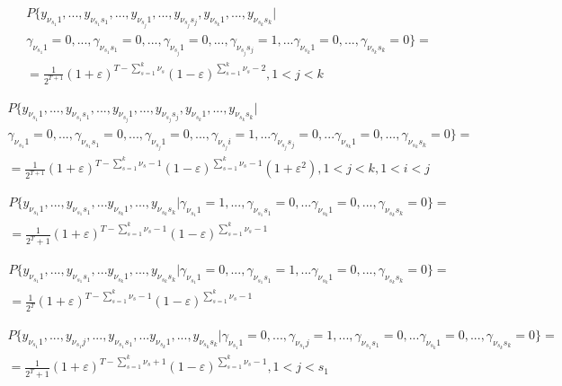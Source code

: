 \documentclass[a4paper,12pt]{article}
\theoremstyle{plain}
\begin{document}
    \begin{gather*}
    P\{y_{\nu_{s_1}1},..., y_{\nu_{s_1}s_1}, ...,y_{\nu_{s_j}1},...,y_{\nu_{s_j}s_j}, y_{\nu_{s_k}1},...,y_{\nu_{s_k}s_k}|\\ \gamma_{\nu_{s_1}1}=0, ..., \gamma_{\nu_{s_1}s_1}=0,...,\gamma_{\nu_{s_j}1}=0,...,\gamma_{\nu_{s_j}s_j}=1,  ...\gamma_{\nu_{s_k}1}=0,...,\gamma_{\nu_{s_k}s_k}=0\} =\\  =\frac{1}{2^{T+1}}(1+\varepsilon)^{T-\sum\limits_{s=1}^{k}\nu_s} (1-\varepsilon)^{\sum\limits_{s=1}^{k}\nu_s-2}, 1<j<k
    \end{gather*} 
    
 
    
    \begin{gather*}
    P\{y_{\nu_{s_1}1},..., y_{\nu_{s_1}s_1}, ...,y_{\nu_{s_j}1},...,y_{\nu_{s_j}s_j}, y_{\nu_{s_k}1},...,y_{\nu_{s_k}s_k}|\\ \gamma_{\nu_{s_1}1}=0, ..., \gamma_{\nu_{s_1}s_1}=0,...,\gamma_{\nu_{s_j}1}=0,...,\gamma_{\nu_{s_j}i}=1,...\gamma_{\nu_{s_j}s_j}=0,  ...\gamma_{\nu_{s_k}1}=0,...,\gamma_{\nu_{s_k}s_k}=0\} =\\  =\frac{1}{2^{T+1}}(1+\varepsilon)^{T-\sum\limits_{s=1}^{k}\nu_s-1} (1-\varepsilon)^{\sum\limits_{s=1}^{k}\nu_s-1}(1+\varepsilon^2), 1<j<k, 1<i<j
    \end{gather*} 
    
    \begin{gather*}
    P\{y_{\nu_{s_1}1},..., y_{\nu_{s_1}s_1}, ...y_{\nu_{s_k}1},...,y_{\nu_{s_k}s_k}|\gamma_{\nu_{s_1}1}=1,..., \gamma_{\nu_{s_1}s_1}=0, ...\gamma_{\nu_{s_k}1}=0,...,\gamma_{\nu_{s_k}s_k}=0\} =\\  =\frac{1}{2^T+1}(1+\varepsilon)^{T-\sum\limits_{s=1}^{k}\nu_s-1} (1-\varepsilon)^{\sum\limits_{s=1}^{k}\nu_s-1}
    \end{gather*} 
    
    \begin{gather*}
    P\{y_{\nu_{s_1}1},..., y_{\nu_{s_1}s_1}, ...y_{\nu_{s_k}1},...,y_{\nu_{s_k}s_k}|\gamma_{\nu_{s_1}1}=0,..., \gamma_{\nu_{s_1}s_1}=1, ...\gamma_{\nu_{s_k}1}=0,...,\gamma_{\nu_{s_k}s_k}=0\} =\\  =\frac{1}{2^T}(1+\varepsilon)^{T-\sum\limits_{s=1}^{k}\nu_s-1} (1-\varepsilon)^{\sum\limits_{s=1}^{k}\nu_s-1}
    \end{gather*} 
    
    
    
    \begin{gather*}
    P\{y_{\nu_{s_1}1},..., y_{\nu_{s_1}j},..., y_{\nu_{s_1}s_1}, ...y_{\nu_{s_k}1},...,y_{\nu_{s_k}s_k}|\gamma_{\nu_{s_1}1}=0,..., \gamma_{\nu_{s_1}j}=1,..., \gamma_{\nu_{s_1}s_1}=0, ...\gamma_{\nu_{s_k}1}=0,...,\gamma_{\nu_{s_k}s_k}=0\} =\\  =\frac{1}{2^T+1}(1+\varepsilon)^{T-\sum\limits_{s=1}^{k}\nu_s+1} (1-\varepsilon)^{\sum\limits_{s=1}^{k}\nu_s-1}, 1<j<s_1
    \end{gather*} 
    
\end{document}
